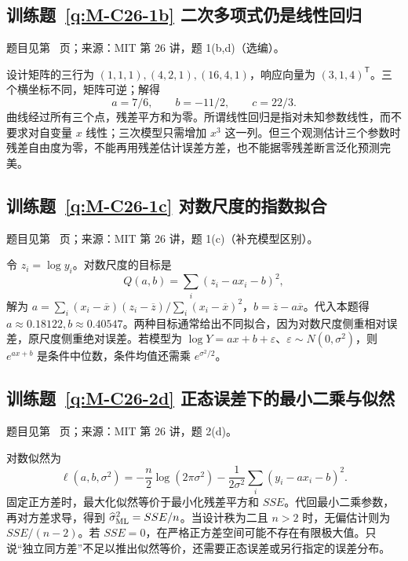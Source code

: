 \subsection*{训练题~\ref{q:M-C26-1b} 二次多项式仍是线性回归}\label{a:M-C26-1b}{\small 题目见第~\pageref{q:M-C26-1b} 页；来源：MIT 第 26 讲，题 1(b,d)（选编）。}
\begin{solve}设计矩阵的三行为 $(1,1,1),(4,2,1),(16,4,1)$，响应向量为 $(3,1,4)^\mathsf T$。三个横坐标不同，矩阵可逆；解得\[a=7/6,\qquad b=-11/2,\qquad c=22/3.\]曲线经过所有三个点，残差平方和为零。所谓线性回归是指对未知参数线性，而不要求对自变量 $x$ 线性；三次模型只需增加 $x^3$ 这一列。但三个观测估计三个参数时残差自由度为零，不能再用残差估计误差方差，也不能据零残差断言泛化预测完美。\end{solve}

\subsection*{训练题~\ref{q:M-C26-1c} 对数尺度的指数拟合}\label{a:M-C26-1c}{\small 题目见第~\pageref{q:M-C26-1c} 页；来源：MIT 第 26 讲，题 1(c)（补充模型区别）。}
\begin{solve}令 $z_i=\log y_i$。对数尺度的目标是\[Q(a,b)=\sum_i(z_i-ax_i-b)^2,\]解为 $a=\sum_i(x_i-\overline x)(z_i-\overline z)/\sum_i(x_i-\overline x)^2$，$b=\overline z-a\overline x$。代入本题得 $a\approx0.18122,b\approx0.40547$。两种目标通常给出不同拟合，因为对数尺度侧重相对误差，原尺度侧重绝对误差。若模型为 $\log Y=ax+b+\varepsilon$、$\varepsilon\sim N(0,\sigma^2)$，则 $e^{ax+b}$ 是条件中位数，条件均值还需乘 $e^{\sigma^2/2}$。\end{solve}

\subsection*{训练题~\ref{q:M-C26-2d} 正态误差下的最小二乘与似然}\label{a:M-C26-2d}{\small 题目见第~\pageref{q:M-C26-2d} 页；来源：MIT 第 26 讲，题 2(d)。}
\begin{solve}对数似然为\[\ell(a,b,\sigma^2)=-\frac n2\log(2\pi\sigma^2)-\frac{1}{2\sigma^2}\sum_i(y_i-ax_i-b)^2.\]固定正方差时，最大化似然等价于最小化残差平方和 $SSE$。代回最小二乘参数，再对方差求导，得到 $\widehat\sigma^2_{\rm ML}=SSE/n$。当设计秩为二且 $n>2$ 时，无偏估计则为 $SSE/(n-2)$。若 $SSE=0$，在严格正方差空间可能不存在有限极大值。只说“独立同方差”不足以推出似然等价，还需要正态误差或另行指定的误差分布。\end{solve}

